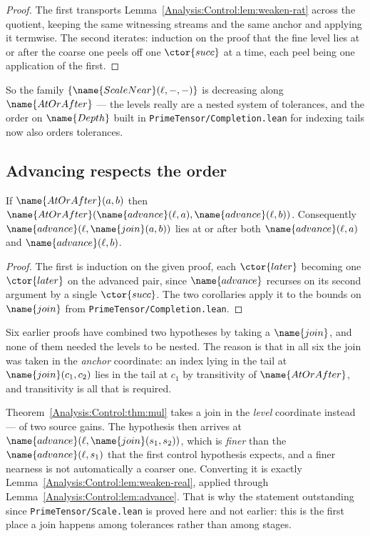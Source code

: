 \begin{proof}
The first transports Lemma~\ref{Analysis:Control:lem:weaken-rat} across the
quotient, keeping the same witnessing streams and the same anchor and applying
it termwise.  The second iterates: induction on the proof that the fine level
lies at or after the coarse one peels off one $\ctor{succ}$ at a time, each
peel being one application of the first.
\end{proof}

So the family $\{\name{ScaleNear}(\ell,-,-)\}$ is decreasing along
$\name{AtOrAfter}$ --- the levels really are a nested system of tolerances, and
the order on $\name{Depth}$ built in
\texttt{PrimeTensor/Completion.lean} for indexing tails now also orders
tolerances.

\subsection{Advancing respects the order}

\begin{lemma}\label{Analysis:Control:lem:advance}
If $\name{AtOrAfter}(a,b)$ then
$\name{AtOrAfter}(\name{advance}(\ell,a), \name{advance}(\ell,b))$.
Consequently $\name{advance}(\ell, \name{join}(a,b))$ lies at or after both
$\name{advance}(\ell,a)$ and $\name{advance}(\ell,b)$.
\end{lemma}

\begin{proof}
The first is induction on the given proof, each $\ctor{later}$ becoming one
$\ctor{later}$ on the advanced pair, since $\name{advance}$ recurses on its
second argument by a single $\ctor{succ}$.  The two corollaries apply it to the
bounds on $\name{join}$ from \texttt{PrimeTensor/Completion.lean}.
\end{proof}

\begin{remark}
\label{Analysis:Control:rem:why-now}
Six earlier proofs have combined two hypotheses by taking a $\name{join}$, and
none of them needed the levels to be nested.  The reason is that in all six the
join was taken in the \emph{anchor} coordinate: an index lying in the tail at
$\name{join}(c_1,c_2)$ lies in the tail at $c_1$ by transitivity of
$\name{AtOrAfter}$, and transitivity is all that is required.

Theorem~\ref{Analysis:Control:thm:mul} takes a join in the \emph{level}
coordinate instead --- of two source gains.  The hypothesis then arrives at
$\name{advance}(\ell, \name{join}(s_1,s_2))$, which is \emph{finer} than the
$\name{advance}(\ell, s_1)$ that the first control hypothesis expects, and a
finer nearness is not automatically a coarser one.  Converting it is exactly
Lemma~\ref{Analysis:Control:lem:weaken-real}, applied through
Lemma~\ref{Analysis:Control:lem:advance}.  That is why the statement
outstanding since \texttt{PrimeTensor/Scale.lean} is proved here and not
earlier: this is the first place a join happens among tolerances rather than
among stages.
\end{remark}

